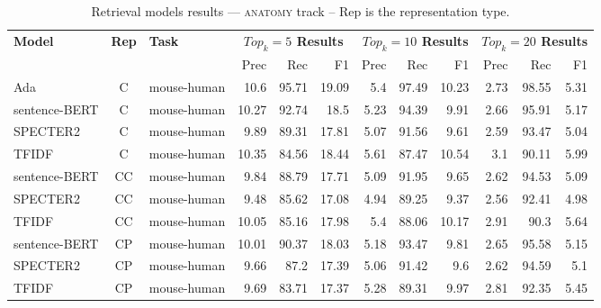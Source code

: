 
    \begin{table}[h]
         \centering
         \caption{Retrieval models results --- \textsc{anatomy} track -- Rep is the representation type.} \label{tab:ir_anatomy}
         \begin{tabular}{|l|c|l|r|r|r|r|r|r|r|r|r|}
             \hline
             \multirow{2}{*}{\textbf{Model}}  & \multirow{2}{*}{\textbf{Rep}}  & \multirow{2}{*}{\textbf{Task}} &  \multicolumn{3}{c|}{\textbf{$Top_k=5$ Results}} &  \multicolumn{3}{c|}{\textbf{$Top_k=10$ Results}} &  \multicolumn{3}{c|}{\textbf{$Top_k=20$ Results}}\\
             \cline{4-12}
              & & & Prec & Rec & F1& Prec & Rec & F1& Prec & Rec & F1 \\
             \hline
    	Ada  & C & mouse-human  & 10.6 & 95.71 & 19.09 & 5.4 & 97.49 & 10.23 & 2.73 & 98.55 & 5.31\\
	sentence-BERT  & C & mouse-human  & 10.27 & 92.74 & 18.5 & 5.23 & 94.39 & 9.91 & 2.66 & 95.91 & 5.17\\
	SPECTER2  & C & mouse-human  & 9.89 & 89.31 & 17.81 & 5.07 & 91.56 & 9.61 & 2.59 & 93.47 & 5.04\\
	TFIDF  & C & mouse-human  & 10.35 & 84.56 & 18.44 & 5.61 & 87.47 & 10.54 & 3.1 & 90.11 & 5.99\\
	\hline
	sentence-BERT  & CC & mouse-human  & 9.84 & 88.79 & 17.71 & 5.09 & 91.95 & 9.65 & 2.62 & 94.53 & 5.09\\
	SPECTER2  & CC & mouse-human  & 9.48 & 85.62 & 17.08 & 4.94 & 89.25 & 9.37 & 2.56 & 92.41 & 4.98\\
	TFIDF  & CC & mouse-human  & 10.05 & 85.16 & 17.98 & 5.4 & 88.06 & 10.17 & 2.91 & 90.3 & 5.64\\
	\hline
	sentence-BERT  & CP & mouse-human  & 10.01 & 90.37 & 18.03 & 5.18 & 93.47 & 9.81 & 2.65 & 95.58 & 5.15\\
	SPECTER2  & CP & mouse-human  & 9.66 & 87.2 & 17.39 & 5.06 & 91.42 & 9.6 & 2.62 & 94.59 & 5.1\\
	TFIDF  & CP & mouse-human  & 9.69 & 83.71 & 17.37 & 5.28 & 89.31 & 9.97 & 2.81 & 92.35 & 5.45\\
	\hline
    \end{tabular}
\end{table}
